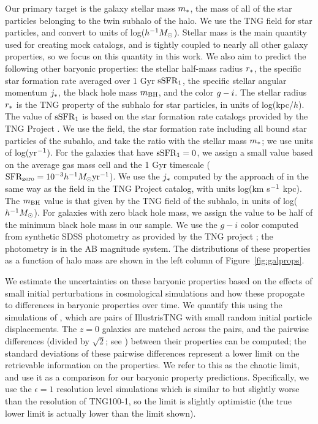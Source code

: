 Our primary target is the galaxy stellar mass $m_*$, the mass of all of the star particles belonging to the twin \hydro subhalo of the \dark halo.
We use the TNG field  for star particles, and convert to units of log($h^{-1} M_\mathrm{\odot}$).
Stellar mass is the main quantity used for creating mock catalogs, and is tightly coupled to nearly all other galaxy properties, so we focus on this quantity in this work.
We also aim to predict the following other baryonic properties: 
the stellar half-mass radius $r_*$, the specific star formation rate averaged over 1 Gyr $\mathrm{sSFR}_1$, the specific stellar angular momentum $j_*$, the black hole mass $m_\mathrm{BH}$, and the color $g-i$. 
The stellar radius $r_*$ is the TNG property  of the subhalo for star particles, in units of log(kpc/$h$).
The value of $\mathrm{sSFR}_1$ is based on the star formation rate catalogs provided by the TNG Project \citep{donnari_star-formation_2019,pillepich_first_2019}.
We use the  field, the star formation rate including all bound star particles of the subahlo, and take the ratio with the stellar mass $m_*$; we use units of log(yr$^{-1}$).
For the galaxies that have $\mathrm{sSFR}_1=0$, we assign a small value based on the average gas mass cell and the 1 Gyr timescale ($\text{SFR}_\mathrm{zero} = 10^{-3} h^{-1} M_\mathrm{\odot} \text{yr}^{-1}$).
We use the $j_*$ computed by the approach of \cite{genel_galactic_2015} in the same way as the  field in the TNG Project catalog, with units log(km s$^{-1}$ kpc). 
The $m_\mathrm{BH}$ value is that given by the TNG field  of the subhalo, in units of log($h^{-1} M_\mathrm{\odot}$).
For galaxies with zero black hole mass, we assign the value to be half of the minimum black hole mass in our sample. 
We use the $g-i$ color computed from synthetic SDSS photometry as provided by the TNG project \citep{nelson_first_2018}; the photometry is in the AB magnitude system. 
The distributions of these properties as a function of \dark halo mass are shown in the left column of Figure~\ref{fig:galprops}.

We estimate the uncertainties on these baryonic properties based on the effects of small initial perturbations in cosmological simulations and how these propogate to differences in baryonic properties over time.
We quantify this using the simulations of \cite{Genel2019}, which are pairs of IllustrisTNG with small random initial particle displacements.
The $z=0$ galaxies are matched across the pairs, and the pairwise differences (divided by $\sqrt{2}$; see \citealt{Genel2019}) between their properties can be computed; the standard deviations of these pairwise differences represent a lower limit on the retrievable information on the properties.
We refer to this as the chaotic limit, and use it as a comparison for our baryonic property predictions.
Specifically, we use the $\epsilon=1$ resolution level simulations which is similar to but slightly worse than the resolution of TNG100-1, so the limit is slightly optimistic (the true lower limit is actually lower than the limit shown).



